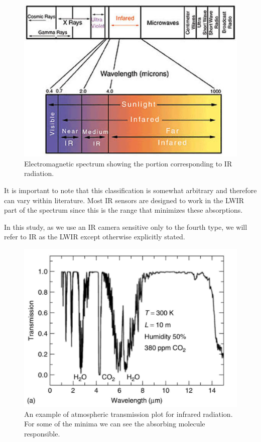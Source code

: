 		\begin{figure}[ht!]
			\centering
			\captionsetup{justification=centering,margin=2cm}
			\includegraphics[scale=0.75]{Figures/Chapter01/lightspectrum.jpg}
			\caption{Electromagnetic spectrum showing the portion corresponding to IR radiation.}\label{fig1.1}
		\end{figure}
		
		It is important to note that this classification is somewhat arbitrary and therefore can vary within literature. Most IR sensors are designed to work in the LWIR part of the spectrum since this is the range that minimizes these absorptions. 
		
		In this study, as we use an IR camera sensitive only to the fourth type, we will refer to IR as the LWIR except otherwise explicitly stated.
				
		\begin{figure}[ht!]
			\centering
			\captionsetup{justification=centering,margin=2cm}
			\includegraphics[scale=0.35]{Figures/Chapter01/Transmission.jpg}
			\caption{An example of atmospheric transmission plot  for infrared radiation. For some of the minima we can see the absorbing molecule responsible.}\label{fig1.2}
		\end{figure}
		
